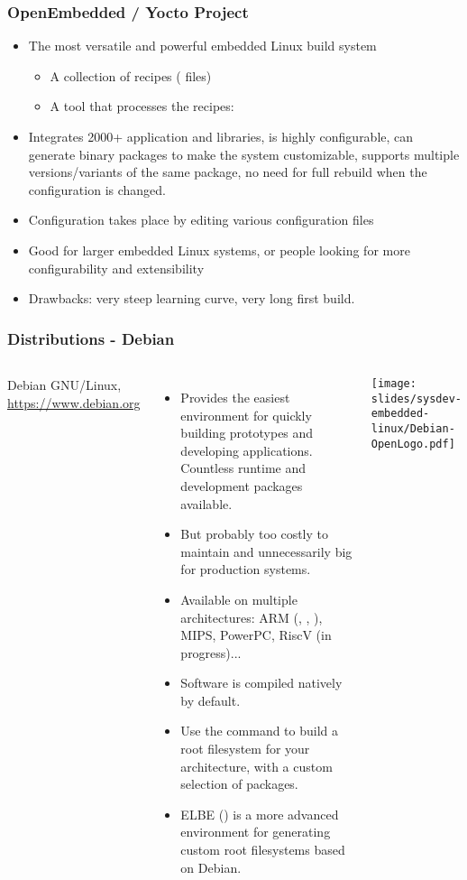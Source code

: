 \begin{frame}
  \frametitle{OpenEmbedded / Yocto Project}
  \begin{itemize}
  \item The most versatile and powerful embedded Linux build system
    \begin{itemize}
    \item A collection of recipes ( files)
    \item A tool that processes the recipes: 
    \end{itemize}
  \item Integrates 2000+ application and libraries, is highly
    configurable, can generate binary packages to make the system
    customizable, supports multiple versions/variants of the same
    package, no need for full rebuild when the configuration is
    changed.
  \item Configuration takes place by editing various configuration
    files
  \item Good for larger embedded Linux systems, or people looking for
    more configurability and extensibility
  \item Drawbacks: very steep learning curve, very long first build.
  \end{itemize}
\end{frame}

\begin{frame}
  \frametitle{Distributions - Debian}
  \small
  \begin{columns}[T]
    Debian GNU/Linux, \url{https://www.debian.org}
    \begin{itemize}
    \item Provides the easiest environment for quickly building prototypes
          and developing applications. Countless runtime and
          development packages available.
    \item But probably too costly to maintain
          and unnecessarily big for production systems.
    \item Available on multiple architectures: ARM (,
          , ), MIPS, PowerPC, RiscV (in progress)...
    \item Software is compiled natively by default.
    \item Use the  command to build a root
          filesystem for your architecture, with a custom selection
	  of packages.
    \item ELBE () is a more advanced
          environment for generating custom root filesystems
	  based on Debian.
    \end{itemize}
    \texttt{[image: slides/sysdev-embedded-linux/Debian-OpenLogo.pdf]}\\
  \end{columns}
\end{frame}

